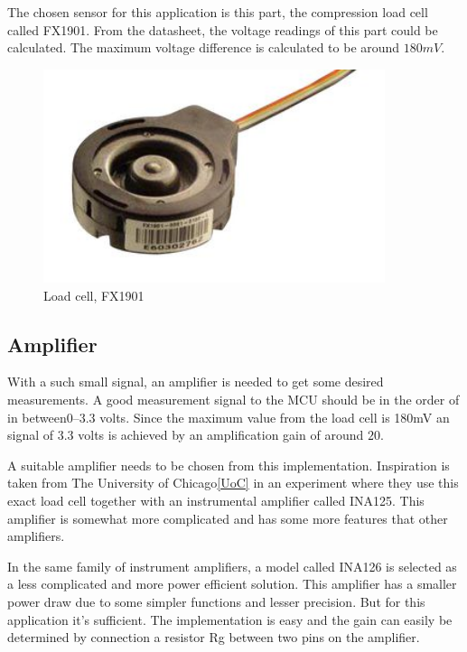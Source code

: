 The chosen sensor for this application is this part, the compression load cell called FX1901\cite{load cell}.  
From the datasheet, the voltage readings of this part could be calculated. The maximum voltage difference is calculated to be around $180mV$. 

\begin{figure}[H]%
\begin{center}
	\includegraphics[width = 10cm]{Figures/Load_cell.png}
	\caption{Load cell, FX1901}
	\label{Load_cell}
\end{center}
\end{figure}


\subsection{Amplifier}
With a such small signal, an amplifier is needed to get some desired measurements. A good measurement signal to the MCU should be in the order of in between$0–3.3$ volts. Since the maximum value from the load cell is 180mV an signal of 3.3 volts is achieved by an amplification gain of around $20$.  

A suitable amplifier needs to be chosen from this implementation. Inspiration is taken from The University of Chicago\ref{UoC} in an experiment where they use this exact load cell together with an instrumental amplifier called INA125. This amplifier is somewhat more complicated and has some more features that other amplifiers.  

In the same family of instrument amplifiers, a model called INA126 is selected as a less complicated and more power efficient solution.  
This amplifier has a smaller power draw due to some simpler functions and lesser precision. But for this application it's sufficient.  
The implementation is easy and the gain can easily be determined by connection a resistor Rg between two pins on the amplifier. 

